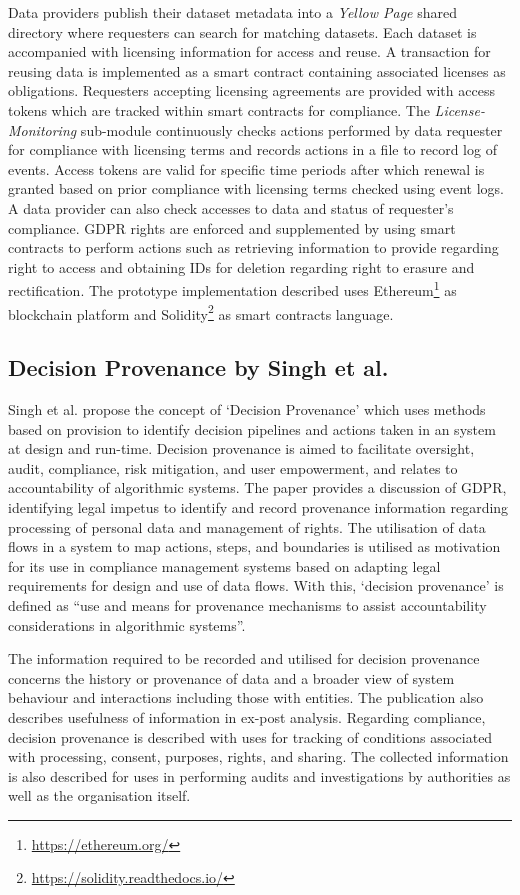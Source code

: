 Data providers publish their dataset metadata into a \textit{Yellow Page} shared directory where requesters can search for matching datasets. Each dataset is accompanied with licensing information for access and reuse. A transaction for reusing data is implemented as a smart contract containing associated licenses as obligations. Requesters accepting licensing agreements are provided with access tokens which are tracked within smart contracts for compliance. The \textit{License-Monitoring} sub-module continuously checks actions performed by data requester for compliance with licensing terms and records actions in a file to record log of events. Access tokens are valid for specific time periods after which renewal is granted based on prior compliance with licensing terms checked using event logs. A data provider can also check accesses to data and status of requester's compliance. GDPR rights are enforced and supplemented by using smart contracts to perform actions such as retrieving information to provide regarding right to access and obtaining IDs for deletion regarding right to erasure and rectification. The prototype implementation described uses Ethereum\footnote{\url{https://ethereum.org/}} as blockchain platform and Solidity\footnote{\url{https://solidity.readthedocs.io/}} as smart contracts language.

\subsection*{Decision Provenance by Singh et al.}
Singh et al. propose the concept of `Decision Provenance' which uses methods based on provision to identify decision pipelines and actions taken in an system at design and run-time. 
Decision provenance is aimed to facilitate oversight, audit, compliance, risk mitigation, and user empowerment, and relates to accountability of algorithmic systems.
The paper provides a discussion of GDPR, identifying legal impetus to identify and record provenance information regarding processing of personal data and management of rights. 
The utilisation of data flows in a system to map actions, steps, and boundaries is utilised as motivation for its use in compliance management systems based on adapting legal requirements for design and use of data flows. With this, `decision provenance' is defined as ``use and means for provenance mechanisms to assist accountability considerations in algorithmic systems''.

The information required to be recorded and utilised for decision provenance concerns the history or provenance of data and a broader view of system behaviour and interactions including those with entities. The publication also describes usefulness of information in ex-post analysis.
Regarding compliance, decision provenance is described with uses for tracking of conditions associated with processing, consent, purposes, rights, and sharing.
The collected information is also described for uses in performing audits and investigations by authorities as well as the organisation itself.

